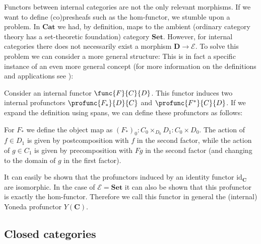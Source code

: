     Functors between internal categories are not the only relevant morphisms. If we want to define (co)presheafs such as the hom-functor, we stumble upon a problem. In $\mathbf{Cat}$ we had, by definition, maps to the ambient (ordinary category theory has a set-theoretic foundation) category $\mathbf{Set}$. However, for internal categories there does not necessarily exist a morphism $\mathbf{D}\rightarrow\mathcal{E}$. To solve this problem we can consider a more general structure:
    This is in fact a specific instance of an even more general concept (for more information on the definitions and applications see \cite{maclane, johnstone}):

    \begin{construct}
        Consider an internal functor $\func{F}{C}{D}$. This functor induces two internal profunctors $\profunc{F_*}{D}{C}$ and $\profunc{F^*}{C}{D}$. If we expand the definition using spans, we can define these profunctors as follows:

        \qquad For $F_*$ we define the object map as $(F_*)_0:C_0\times_{D_0} D_1:C_0\times D_0$. The action of $f\in D_1$ is given by postcomposition with $f$ in the second factor, while the action of $g\in C_1$ is given by precomposition with $Fg$ in the second factor (and changing to the domain of $g$ in the first factor).

        It can easily be shown that the profunctors induced by an identity functor $\text{id}_{\mathbf{C}}$ are isomorphic. In the case of $\mathcal{E}=\mathbf{Set}$ it can also be shown that this profunctor is exactly the hom-functor. Therefore we call this functor in general the (internal) Yoneda profunctor $Y(\mathbf{C})$.
    \end{construct}

\subsection{Closed categories}

